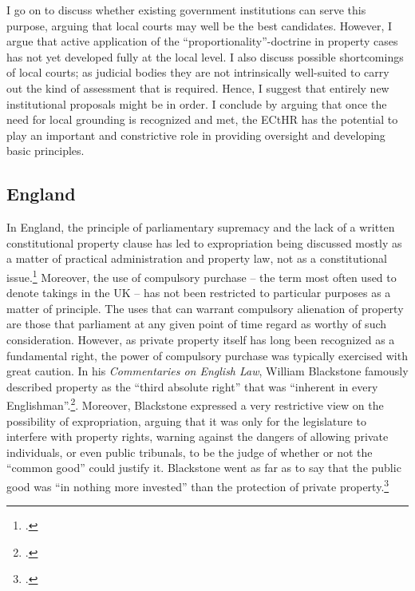 I go on to discuss whether existing government institutions can serve this purpose, arguing that local courts may well be the best candidates. However, I argue that active application of the ``proportionality''-doctrine in property cases has not yet developed fully at the local level. I also discuss possible shortcomings of local courts; as judicial bodies they are not intrinsically well-suited to carry out the kind of assessment that is required. Hence, I suggest that entirely new institutional proposals might be in order. I conclude by arguing that once the need for local grounding is recognized and met, the ECtHR has the potential to play an important and constrictive role in providing oversight and developing basic principles.

\subsection{England}\label{sec:england}

In England, the principle of parliamentary supremacy and the lack of a written constitutional property clause has led to expropriation being discussed mostly as a matter of practical administration and property law, not as a constitutional issue.\footcite{taggart98} Moreover, the use of compulsory purchase -- the term most often used to denote takings in the UK -- has not been restricted to particular purposes as a matter of principle. The uses that can warrant compulsory alienation of property are those that parliament at any given point of time regard as worthy of such consideration. However, as private property itself has long been recognized as a fundamental right, the power of compulsory purchase was typically exercised with great caution. In his {\it Commentaries on English Law}, William Blackstone famously described property as the ``third absolute right'' that was ``inherent in every Englishman''.\footcite[134-135]{blackstone79}.  Moreover, Blackstone expressed a very restrictive view on the possibility of expropriation, arguing that it was only for the legislature to interfere with property rights, warning against the dangers of allowing private individuals, or even public tribunals, to be the judge of whether or not the ``common good'' could justify it. Blackstone went as far as to say that the public good was ``in nothing more invested'' than the protection of private property.\footcite[134-135]{blackstone79}

